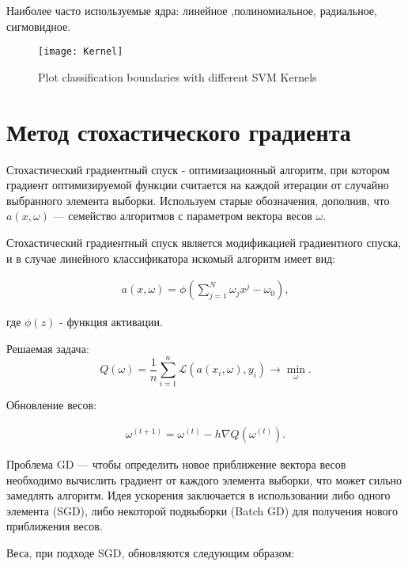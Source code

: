 \documentclass[12pt]{article}
\begin{document}
	Наиболее часто используемые ядра: линейное ,полиномиальное, радиальное, сигмовидное.
	
	\vspace{1cm}
	
	\begin{figure}[!ht]
		\centering
		\texttt{[image: Kernel]}
		\caption{Plot classification boundaries with different SVM Kernels}
		\label{5}
	\end{figure}

	\newpage
	

	\section{Метод стохастического градиента}
	
	Стохастический градиентный спуск - оптимизационный алгоритм, при котором градиент оптимизируемой функции считается на каждой итерации от случайно выбранного элемента выборки. Используем старые обозначения, дополнив, что $ a(x, \omega) $ --- семейство алгоритмов с параметром вектора весов $ \omega $.
	

	Стохастический градиентный спуск является модификацией градиентного спуска, и в случае линейного классификатора искомый алгоритм имеет вид:
	
	\begin{eqnarray}
	a(x, \omega) = \phi(\sum\limits_{j=1}^N \omega_jx^j - \omega_0),
	\end{eqnarray}
	
	где $\phi(z) $ - функция активации. 
	
	Решаемая задача:
	$$ Q(\omega) = \frac{1}{n}\sum\limits_{i=1}^{n}\mathcal{L}(a(x_i, \omega), y_i)\rightarrow\min\limits_{\omega}. $$
	
	Обновление весов:
	
	\begin{eqnarray}
	\omega^{(t+1)} = \omega^{(t)} - h\nabla Q(\omega^{(t)}).
	\end{eqnarray}
	
	Проблема GD --- чтобы определить новое приближение вектора весов необходимо вычислить градиент от каждого элемента выборки, что может сильно замедлять алгоритм.
	Идея ускорения заключается в использовании либо одного элемента (SGD), либо некоторой подвыборки (Batch GD) для получения нового приближения весов. 
	
	Веса, при подходе SGD, обновляются следующим образом:
	
\end{document}
